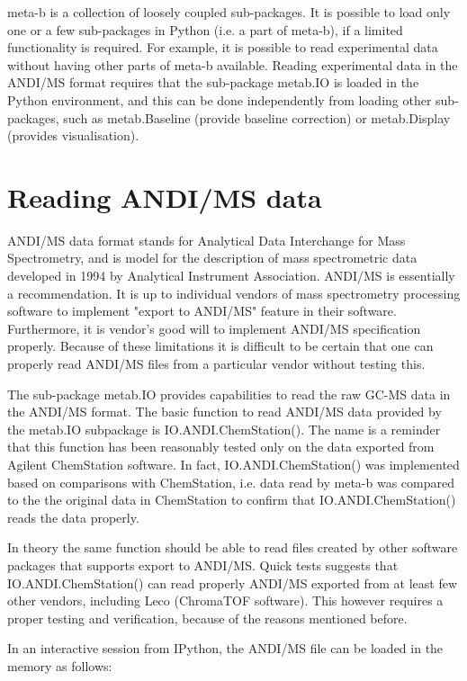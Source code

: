 meta-b is a collection of loosely coupled sub-packages. It is possible
to load only one or a few sub-packages in Python (i.e. a part of meta-b),
if a limited functionality is required. For example, it is possible
to read experimental data without having other parts of meta-b
available. Reading experimental data in the ANDI/MS format requires
that the sub-package metab.IO is loaded in the Python environment,
and this can be done independently from loading other sub-packages,
such as metab.Baseline (provide baseline correction) or metab.Display
(provides visualisation).

\section{Reading ANDI/MS data}

ANDI/MS data format stands for Analytical Data Interchange for Mass
Spectrometry, and is model for the description of mass spectrometric
data developed in 1994 by Analytical Instrument Association. ANDI/MS 
is essentially a recommendation. It is up to individual vendors of
mass spectrometry processing software to implement "export to ANDI/MS"
feature in their software. Furthermore, it is vendor's good will to
implement ANDI/MS specification properly. Because of these limitations
it is difficult to be certain that one can properly read ANDI/MS
files from a particular vendor without testing this.

The sub-package metab.IO provides capabilities to read the raw GC-MS
data in the ANDI/MS format. The basic function to read ANDI/MS data
provided by the metab.IO subpackage is IO.ANDI.ChemStation(). The
name is a reminder that this function has been reasonably tested
only on the data exported from Agilent ChemStation software.
In fact, IO.ANDI.ChemStation() was implemented based on comparisons
with ChemStation, i.e. data read by meta-b was compared to the
the original data in ChemStation to confirm that IO.ANDI.ChemStation()
reads the data properly.

In theory the same function should be able to read files created by
other software packages that supports export to ANDI/MS. Quick tests
suggests that IO.ANDI.ChemStation() can read properly ANDI/MS exported
from at least few other vendors, including Leco (ChromaTOF software).
This however requires a proper testing and verification, because of
the reasons mentioned before.
 
In an interactive session from IPython, the ANDI/MS file can be loaded
in the memory as follows:

